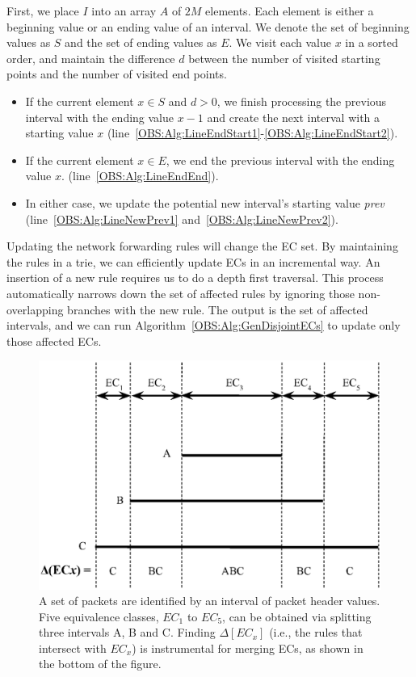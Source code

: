 First, we place $I$ into an array $A$ of $2M$ elements. Each element is either a beginning value or an ending value of an interval. We denote the set of beginning values as $S$ and the set of ending values as $E$. We visit each value $x$ in a sorted order, and maintain the difference $d$ between the number of visited starting points and the number of visited end points.
\begin{itemize}
    \item If the current element $x \in S$ and $d > 0$,
        we finish processing the previous interval with the ending value $x - 1$ and
        create the next interval with a starting value $x$
        (line~\ref{OBS:Alg:LineEndStart1}-\ref{OBS:Alg:LineEndStart2}).
    \item If the current element $x \in E$, we end the previous interval with the ending value $x$.
        (line~\ref{OBS:Alg:LineEndEnd}).
    \item In either case, we update the potential new interval's starting value \textit{prev}
        (line~\ref{OBS:Alg:LineNewPrev1} and~\ref{OBS:Alg:LineNewPrev2}).
\end{itemize}

Updating the network forwarding rules will change the EC set.
By maintaining the rules in a trie, we can efficiently update ECs in an incremental way. An insertion of a new rule requires us to do a depth first traversal. This process automatically narrows down the set of affected rules by ignoring those non-overlapping branches with the new rule.
The output is the set of affected intervals, and we can run Algorithm~\ref{OBS:Alg:GenDisjointECs} to update only those affected ECs.

\begin{figure}[t]
    \centering
    \includegraphics[scale=.52]{OneBigSwitch/figures/DisjointECs.eps}
    \caption[Equivalence Classes as Disjoint Intervals]{A set of packets are identified by
    an interval of packet header values.
    Five equivalence classes, $EC_1$ to $EC_5$, can be obtained via splitting three intervals
    A, B and C.
    Finding $\Delta[EC_x]$ (i.e., the rules that intersect with $EC_x$) is instrumental for
    merging ECs, as shown in the bottom of the figure.}
    \label{OBS:Fig:DisjointECsAsInterval}
\end{figure}

